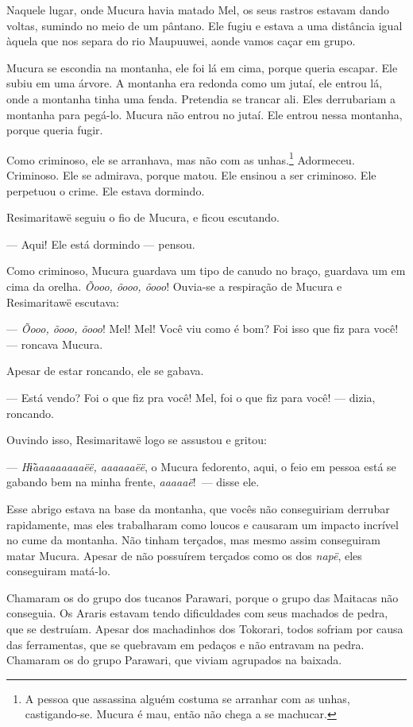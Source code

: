 Naquele lugar, onde Mucura havia matado Mel, os seus rastros estavam
dando voltas, sumindo no meio de um pântano. Ele fugiu e estava a uma
distância igual àquela que nos separa do rio Maupuuwei, aonde
vamos {caçar em grupo}. 

Mucura se escondia na montanha, ele foi lá em cima, porque queria
escapar. Ele subiu em uma árvore. A montanha era redonda como um jutaí,
ele entrou lá, onde a montanha tinha uma fenda. Pretendia se trancar
ali. Eles derrubariam a montanha para pegá-lo. Mucura não entrou no
jutaí. Ele entrou nessa montanha, porque queria fugir. 

Como criminoso, ele se arranhava, mas não com as
unhas.\footnote{A pessoa que assassina alguém costuma se arranhar com as unhas,
castigando-se. Mucura é mau, então não chega a se machucar.}  Adormeceu. Criminoso. Ele se admirava, porque
matou. Ele ensinou a ser criminoso. Ele perpetuou o crime. Ele estava
dormindo.

Resimaritawë seguiu o fio de Mucura, e ficou escutando. 

--- Aqui! Ele está dormindo --- pensou.

Como criminoso, Mucura guardava um tipo de canudo no braço, guardava um
em cima da orelha. \textit{Õooo, õooo, õooo}! Ouvia-se a respiração de
Mucura e Resimaritawë escutava:

--- \textit{Õooo, õooo, õooo}! Mel! Mel! Você viu como é bom? Foi isso que
fiz para você! --- roncava Mucura. 

Apesar de estar roncando, ele se gabava. 

--- Está vendo? Foi o que fiz pra você! Mel, foi o que fiz para você!
--- dizia, roncando.

Ouvindo isso, Resimaritawë logo se assustou e gritou: 

--- \textit{Hɨ̃aaaaaaaaaëë, aaaaaaëë}, o Mucura fedorento, aqui, o feio em
 pessoa está se gabando bem na minha frente, \textit{aaaaaë}!~--- disse ele.

Esse abrigo estava na base da montanha, que vocês não conseguiriam
 derrubar rapidamente, mas eles trabalharam como loucos e causaram um
 impacto incrível no cume da montanha. Não tinham terçados, mas mesmo
 assim conseguiram matar Mucura. Apesar de não possuírem terçados como os
 dos \textit{napë}, eles conseguiram matá-lo.

Chamaram os do grupo dos tucanos Parawari, porque o grupo das
 Maitacas não conseguia. Os Araris estavam tendo dificuldades com seus
 machados de pedra, que se destruíam. Apesar dos machadinhos
 dos Tokorari, todos sofriam por causa das ferramentas, que se
 quebravam em pedaços e não entravam na pedra. Chamaram os do grupo
 Parawari, que viviam agrupados na baixada.

